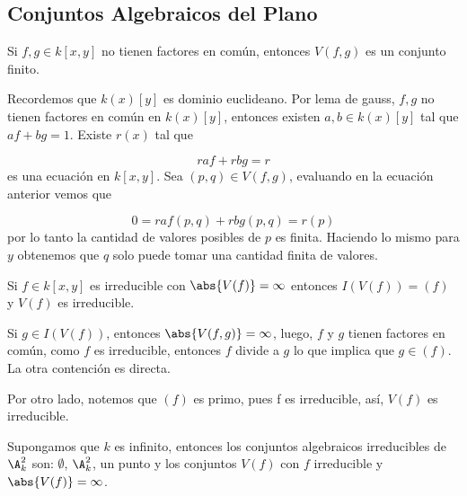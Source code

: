 \documentclass{article}
\begin{document}
\subsection{Conjuntos Algebraicos del Plano}

\begin{lema}
    Si $f,g\in k[x,y]$ no tienen factores en común, entonces $V(f,g)$ es un conjunto finito.
\end{lema}

\begin{dem}
    Recordemos que $k(x)[y]$ es dominio euclideano. Por lema de gauss, $f,g$ no tienen factores en
    común en $k(x)[y]$, entonces existen $a,b\in k(x)[y]$ tal que $af+bg=1$. Existe $r(x)$ tal que
    
    \begin{equation*}
        raf+rbg=r
    \end{equation*}
    es una ecuación en $k[x,y]$. Sea $(p,q)\in V(f,g)$, evaluando en la ecuación anterior vemos que
    
    \begin{equation*}
        0=raf(p,q)+rbg(p,q)=r(p)
    \end{equation*}
    por lo tanto la cantidad de valores posibles de $p$ es finita. Haciendo lo mismo para $y$ 
    obtenemos que $q$ solo puede tomar una cantidad finita de valores.
\end{dem}

\begin{cor}
    Si $f\in k[x,y]$ es irreducible con $\abs{V(f)}=\infty$ entonces $I(V(f))=(f)$ y $V(f)$ es 
    irreducible.
\end{cor}

\begin{dem}
    Si $g\in I(V(f))$, entonces $\abs{V(f,g)}=\infty$, luego, $f$ y $g$ tienen factores en común,
    como $f$ es irreducible, entonces $f$ divide a $g$ lo que implica que $g\in(f)$. La otra
    contención es directa.
    \vspace{4mm}

    \noindent Por otro lado, notemos que $(f)$ es primo, pues f es irreducible, así, $V(f)$ es 
    irreducible.
\end{dem}

\begin{cor}
    Supongamos que $k$ es infinito, entonces los conjuntos algebraicos irreducibles de $\A_{k}^{2}$
    son: $\emptyset$, $\A_{k}^{2}$, un punto y los conjuntos $V(f)$ con $f$ irreducible y 
    $\abs{V(f)}=\infty$.
\end{cor}
\end{document}
